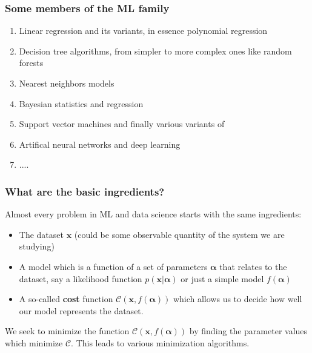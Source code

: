 \documentclass{beamer}
\begin{document}
\begin{frame}
\frametitle{Some members of the ML family}

\begin{block}{}
\begin{enumerate}
\item Linear regression and its variants, in essence polynomial regression

\item Decision tree algorithms, from simpler to more complex ones like random forests

\item Nearest neighbors models

\item Bayesian statistics and regression

\item Support vector machines and finally various variants of

\item Artifical neural networks and deep learning

\item ....
\end{enumerate}

\noindent
\end{block}
\end{frame}

\begin{frame}
\frametitle{What are the basic ingredients?}

\begin{block}{}
Almost every problem in ML and data science starts with the same ingredients:
\begin{itemize}
\item The dataset $\mathbf{x}$ (could be some observable quantity of the system we are studying)

\item A model which is a function of a set of parameters $\mathbf{\alpha}$ that relates to the dataset, say a likelihood  function $p(\mathbf{x}\vert \mathbf{\alpha})$ or just a simple model $f(\mathbf{\alpha})$

\item A so-called \textbf{cost} function $\mathcal{C} (\mathbf{x}, f(\mathbf{\alpha}))$ which allows us to decide how well our model represents the dataset. 
\end{itemize}

\noindent
We seek to minimize the function $\mathcal{C} (\mathbf{x}, f(\mathbf{\alpha}))$ by finding the parameter values which minimize $\mathcal{C}$. This leads to  various minimization algorithms. 
\end{block}
\end{frame}
\end{document}
